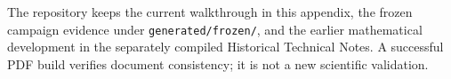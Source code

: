 The repository keeps the current walkthrough in this appendix, the frozen
campaign evidence under \texttt{generated/frozen/}, and the earlier
mathematical development in the separately compiled Historical Technical Notes. A successful PDF
build verifies document consistency; it is not a new scientific validation.
\FloatBarrier
